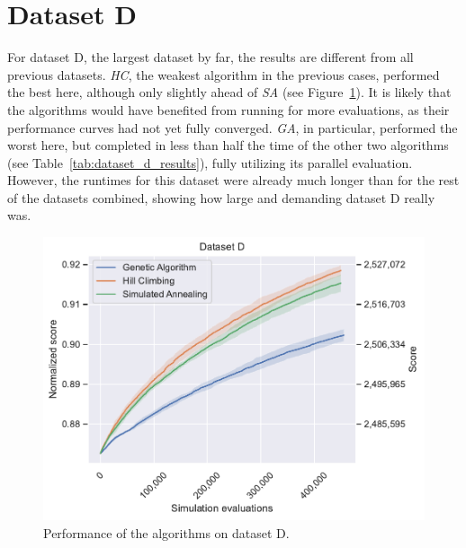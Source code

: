 \newpage
\section{Dataset D} \label{sec:dataset_d}

For dataset D, the largest dataset by far, the results are different from all previous datasets. \textit{HC}, the weakest algorithm in the previous cases, performed the best here, although only slightly ahead of \textit{SA} (see Figure~\ref{fig:dataset_d_experiment}). It is likely that the algorithms would have benefited from running for more evaluations, as their performance curves had not yet fully converged.
\textit{GA}, in particular, performed the worst here, but completed in less than half the time of the other two algorithms (see Table~\ref{tab:dataset_d_results}), fully utilizing its parallel evaluation.
However, the runtimes for this dataset were already much longer than for the rest of the datasets combined, showing how large and demanding dataset D really was.

\bigskip

\begin{figure}[h]
    \centering
    \includegraphics[width=\linewidth]{img/experiments/d_Genetic Algorithm_Hill Climbing_Simulated Annealing.pdf}
    \caption[Performance of the algorithms on dataset D]{
        Performance of the algorithms on dataset D.
    }
    \label{fig:dataset_d_experiment}
\end{figure}


